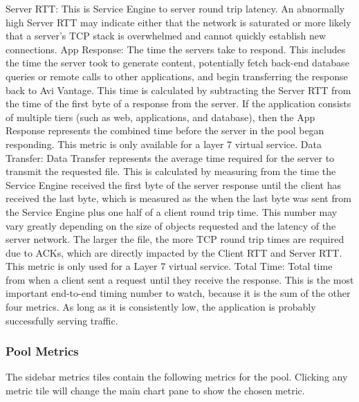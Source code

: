 \documentclass[letterpaper,10pt,english]{sphinxmanual}
\begin{document}
Server RTT: This is Service Engine to server round trip latency. An abnormally high Server RTT may indicate either that the network is saturated or more likely that a server’s TCP stack is overwhelmed and cannot quickly establish new connections.
App Response: The time the servers take to respond. This includes the time the server took to generate content, potentially fetch back-end database queries or remote calls to other applications, and begin transferring the response back to Avi Vantage. This time is calculated by subtracting the Server RTT from the time of the first byte of a response from the server. If the application consists of multiple tiers (such as web, applications, and database), then the App Response represents the combined time before the server in the pool began responding. This metric is only available for a layer 7 virtual service.
Data Transfer: Data Transfer represents the average time required for the server to transmit the requested file. This is calculated by measuring from the time the Service Engine received the first byte of the server response until the client has received the last byte, which is measured as the when the last byte was sent from the Service Engine plus one half of a client round trip time. This number may vary greatly depending on the size of objects requested and the latency of the server network. The larger the file, the more TCP round trip times are required due to ACKs, which are directly impacted by the Client RTT and Server RTT. This metric is only used for a Layer 7 virtual service.
Total Time: Total time from when a client sent a request until they receive the response. This is the most important end-to-end timing number to watch, because it is the sum of the other four metrics. As long as it is consistently low, the application is probably successfully serving traffic.


\subsubsection{Pool Metrics}
\label{\detokenize{getting_started/pool:pool-metrics}}
The sidebar metrics tiles contain the following metrics for the pool. Clicking any metric tile will change the main chart pane to show the chosen metric.
\end{document}
